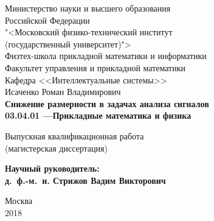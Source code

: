 \documentclass[12pt,oneside]{article}
\theoremstyle{definition}
\begin{document}
\begin{titlepage}
	\thispagestyle{empty}
	\begin{center}
		\sc
		
		Министерство науки и высшего образования \\ Российской Федерации \\
		"<Московский физико-технический институт \\
		(государственный университет)"> \\
		Физтех-школа прикладной математики и информатики\\
		Факультет управления и прикладной математики \\
		Кафедра <<Интеллектуальные системы>>\\[35mm]
		\rm\large
		Исаченко Роман Владимирович\\[10mm]
		\bf\Large
		Снижение размерности в задачах анализа сигналов\\[10mm]
		\rm\normalsize
		03.04.01 ---Прикладные математика и физика\\[10mm]
		\sc
		
		Выпускная квалификационная работа\\
		(магистерская диссертация)\\[10mm]
	\end{center}
	\hfill\parbox{80mm}{
		\begin{flushleft}
			\bf
			Научный руководитель:\\
			\rm
			д.~ф.-м.~н. Стрижов Вадим Викторович\\[5cm]
		\end{flushleft}
	}
	
	\vspace{\fill}
	\begin{center}
		Москва\\
		2018
	\end{center}
\end{titlepage}
\end{document}
